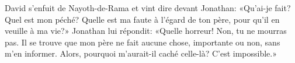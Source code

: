 David s’enfuit de Nayoth-de-Rama et vint dire devant Jonathan:
	«Qu’ai-je fait? Quel est mon péché?
	Quelle est ma faute à l’égard de ton père, pour qu’il en veuille à ma vie?»
Jonathan lui répondit:
	«Quelle horreur! Non, tu ne mourras pas.
Il se trouve que mon père ne fait aucune chose, importante ou non, sans m’en informer.
	Alors, pourquoi m’aurait-il caché celle-là?
	C’est impossible.»
